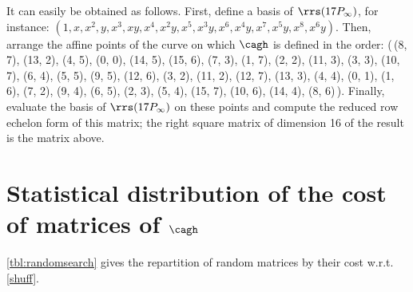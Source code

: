 It can easily be obtained as follows. First, define a basis of $\rrs(17P_\infty)$, for instance:
$(1, x, x^2, y, x^3, xy, x^4, x^2 y, x^5, x^3 y, x^6, x^4 y, x^7, x^5 y, x^8, x^6 y)$. Then, arrange the
affine points of the curve on which $\cagh$ is defined in the order:
(\,(8, 7), (13, 2), (4, 5), (0, 0), (14, 5), (15, 6), (7, 3), (1, 7), (2, 2), (11, 3), (3, 3), (10, 7), (6, 4),
(5, 5), (9, 5), (12, 6), (3, 2), (11, 2), (12, 7), (13, 3), (4, 4), (0, 1), (1, 6), (7, 2), (9, 4), (6, 5), (2, 3),
(5, 4), (15, 7), (10, 6), (14, 4), (8, 6)\,). Finally, evaluate the basis of $\rrs(17P_\infty)$ on these
points and compute the reduced row echelon form of this matrix;
the right square matrix of dimension 16 of the result is the matrix above.

\FloatBarrier

\section{Statistical distribution of the cost of matrices of $\cagh$}
\label{app:stats}

\autoref{tbl:randomsearch} gives the repartition of random matrices by their cost w.r.t. \autoref{shuff}.

